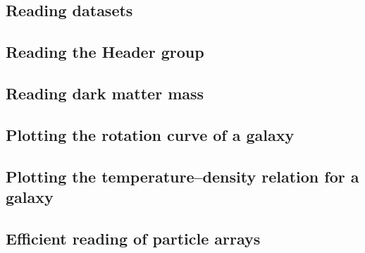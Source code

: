 \documentclass[10pt, a4paper]{article}
\begin{document}
\subsection{Reading datasets}

\subsection{Reading the {\sc Header} group}

\subsection{Reading dark matter mass}

\subsection{Plotting the rotation curve of a galaxy}

\subsection{Plotting the temperature--density relation for a galaxy}

\subsection{Efficient reading of particle arrays}

\newpage
\end{document}
